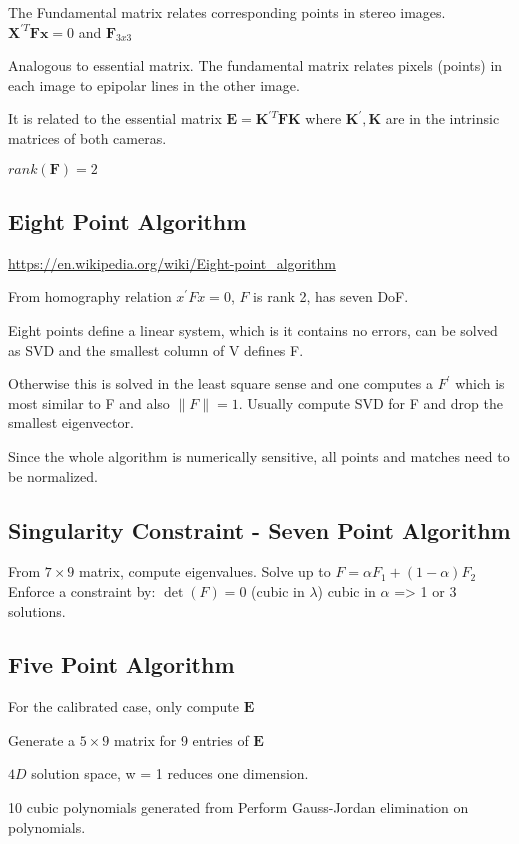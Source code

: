 The Fundamental matrix relates corresponding points in stereo images. $\mathbf{X}^{\prime T}\mathbf{Fx}=0$ and $\mathbf{F}_{3x3}$

Analogous to essential matrix. The fundamental matrix relates pixels (points) in each image to epipolar lines in the other image.

It is related to the essential matrix $\mathbf{E} = \mathbf{K}^{\prime T} \mathbf{FK}$ where $\mathbf{K}^{\prime}, \mathbf{K}$ are in the intrinsic matrices of both cameras.

$rank(\mathbf{F}) = 2$

\subsection{Eight Point Algorithm}

\url{https://en.wikipedia.org/wiki/Eight-point_algorithm}

From homography relation $x^\prime F x = 0$, $F$ is rank 2, has seven DoF. 

Eight points define a linear system, which is it contains no errors, can be solved as SVD and the smallest column of V defines F.

Otherwise this is solved in the least square sense and one computes a $F^\prime$ which is most similar to F and also $\|F\|=1$. Usually compute SVD for F and drop the smallest eigenvector. 

Since the whole algorithm is numerically sensitive, all points and matches need to be normalized. 

\subsection{Singularity Constraint - Seven Point Algorithm}
From $7\times9$ matrix, compute eigenvalues.
Solve up to $F = \alpha F_1 + (1-\alpha) F_2$
Enforce a constraint by: $\det(F) = 0$ (cubic in $\lambda$)
cubic in $\alpha$ => 1 or 3 solutions.

\subsection{Five Point Algorithm}

For the calibrated case, only compute $\mathbf{E}$

Generate a $5\times9$ matrix for 9 entries of $\mathbf{E}$

$4D$ solution space, w = 1 reduces one dimension.

10 cubic polynomials generated from 
Perform Gauss-Jordan elimination on polynomials.

